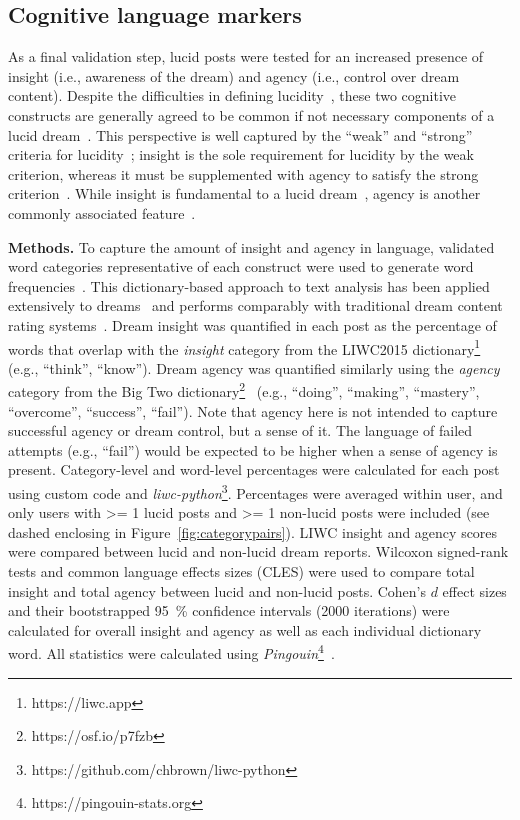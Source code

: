 \documentclass[10pt,a4paper,twocolumn]{article}
\begin{document}
\subsection{Cognitive language markers}\label{sec:liwc}

As a final validation step, lucid posts were tested for an increased presence of insight (i.e., awareness of the dream) and agency (i.e., control over dream content). Despite the difficulties in defining lucidity~\cite{mallett2021}, these two cognitive constructs are generally agreed to be common if not necessary components of a lucid dream~\cite{windt2007,voss2013,baird2019,stumbrys2014,mallett2021}. This perspective is well captured by the ``weak'' and ``strong'' criteria for lucidity~\cite{windt2007}; insight is the sole requirement for lucidity by the weak criterion, whereas it must be supplemented with agency to satisfy the strong criterion~\cite{windt2007}. While insight is fundamental to a lucid dream~\cite{voss2013,baird2019}, agency is another commonly associated feature~\cite{stumbrys2014,mallett2021,motarolim2013,voss2013,dresler2014}.

\smallskip
\noindent
\textbf{Methods.}
To capture the amount of insight and agency in language, validated word categories representative of each construct were used to generate word frequencies~\cite{tausczik2010}. This dictionary-based approach to text analysis has been applied extensively to dreams~\cite{bulkeley2018,hawkins2017,elce2021} and performs comparably with traditional dream content rating systems~\cite{zheng2021}. Dream insight was quantified in each post as the percentage of words that overlap with the \emph{insight} category from the LIWC2015 dictionary\footnote{https://liwc.app}~\cite{pennebaker2015} (e.g., ``think'', ``know''). Dream agency was quantified similarly using the \emph{agency} category from the Big Two dictionary\footnote{https://osf.io/p7fzb}~\cite{pietraszkiewicz2019} (e.g., ``doing'', ``making'', ``mastery'', ``overcome'', ``success'', ``fail''). Note that agency here is not intended to capture successful agency or dream control, but a sense of it. The language of failed attempts (e.g., ``fail'') would be expected to be higher when a sense of agency is present. Category-level and word-level percentages were calculated for each post using custom code and \emph{liwc-python}\footnote{https://github.com/chbrown/liwc-python}. Percentages were averaged within user, and only users with \num{>= 1} lucid posts and \num{>= 1} non-lucid posts were included (see dashed enclosing in Figure~\ref{fig:categorypairs}). LIWC insight and agency scores were compared between lucid and non-lucid dream reports. Wilcoxon signed-rank tests and common language effects sizes (CLES) were used to compare total insight and total agency between lucid and non-lucid posts. Cohen's $d$ effect sizes and their bootstrapped \qty{95}{\percent} confidence intervals (\num{2000} iterations) were calculated for overall insight and agency as well as each individual dictionary word. All statistics were calculated using \emph{Pingouin}\footnote{https://pingouin-stats.org}~\cite{vallat2018}.
\end{document}
